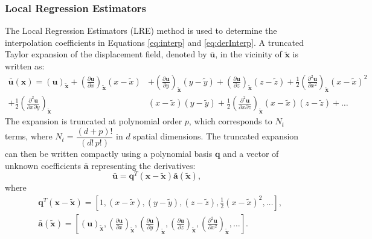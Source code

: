 \documentclass[sn-mathphys,Numbered]{sn-jnl}%
\newcommand{\bb}{\boldsymbol}
\begin{document}
\subsubsection{Local Regression Estimators}
%
The Local Regression Estimators (LRE) method is used to determine the interpolation coefficients in Equations \eqref{eq:interp} and \eqref{eq:derInterp}.
A truncated Taylor expansion of the displacement field, denoted by $\bar{\boldsymbol{u}}$, in the vicinity of $\tilde{\boldsymbol{x}}$ is written as:
%
\begin{equation}
\begin{split}
\bar{\bb{u}}(\bb{x}) =
(\bb{u})_{\tilde{\bb{x}}}
 + \left(\frac{\partial \bb{u}}{\partial x}\right)_{\tilde{\bb{x}}}(x-\tilde{x})&
 + \left(\frac{\partial \bb{u}}{\partial y}\right)_{\tilde{\bb{x}}}(y-\tilde{y})
 + \left(\frac{\partial \bb{u}}{\partial z}\right)_{\tilde{\bb{x}}}(z-\tilde{z})
 + \frac{1}{2}\left(\frac{\partial^2 \bb{u}}{\partial x^2}\right)_{\tilde{\bb{x}}}(x-\tilde{x})^2 \\
 +  \frac{1}{2}\left(\frac{\partial^2 \bb{u}}{\partial x \partial y}\right)_{\tilde{\bb{x}}}&(x-\tilde{x})(y-\tilde{y})
 +  \frac{1}{2}\left(\frac{\partial^2 \bb{u}}{\partial x \partial z}\right)_{\tilde{\bb{x}}}(x-\tilde{x})(z-\tilde{z})
 + \dots
\end{split}
\end{equation}
%
The expansion is truncated at polynomial order $p$, which corresponds to $N_t$ terms, where $N_t = \dfrac{(d+p)!}{(d!\,p!)}$ in $d$ spatial dimensions.
The truncated expansion can then be written compactly using a polynomial basis $\mathbf{q}$ and a vector of unknown coefficients $\bar{\mathbf{a}}$ representing the derivatives:
%
\begin{equation}
\bar{\bb{u}} = \mathbf{q}^T(\bb{x}-\tilde{\bb{x}})\bar{\mathbf{a}}(\tilde{\bb{x}}),
\end{equation}
%
where
%
\begin{equation}
\begin{split}
&\mathbf{q}^T(\bb{x}-\tilde{\bb{x}}) = \left[1, (x-\tilde{x}), (y-\tilde{y}), (z-\tilde{z}), \frac{1}{2}(x-\tilde{x})^2, \dots \right],\\
& \bar{\mathbf{a}}(\tilde{\bb{x}}) = \left[(\bb{u})_{\tilde{\bb{x}}}, \left(\frac{\partial \bb{u}}{\partial x}\right)_{\tilde{\bb{x}}},
 \left(\frac{\partial \bb{u}}{\partial y}\right)_{\tilde{\bb{x}}}, 
 \left(\frac{\partial \bb{u}}{\partial z}\right)_{\tilde{\bb{x}}},
 \left(\frac{\partial^2 \bb{u}}{\partial x^2}\right)_{\tilde{\bb{x}}},
 \dots  \right].
\end{split}
\end{equation}
\end{document}
